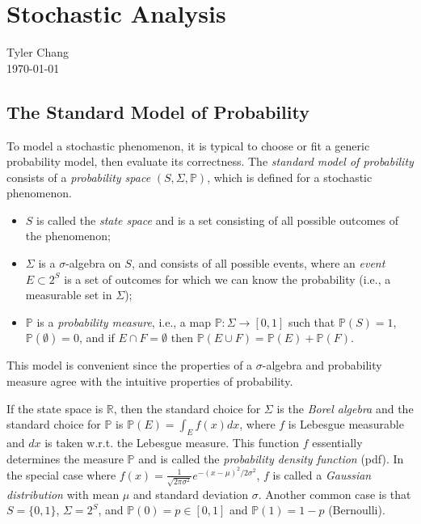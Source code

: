 \documentclass[12pt]{article}
\begin{document}
\section*{Stochastic Analysis}
Tyler Chang\\
\today

\subsection*{The Standard Model of Probability}

To model a stochastic phenomenon, it is typical to choose or fit a
generic probability model, then evaluate its correctness.
The {\it standard model of probability} consists of a
{\it probability space} $(S, \Sigma, \mathbb{P})$, which is defined
for a stochastic phenomenon.
\begin{itemize}
	\item $S$ is called the {\it state space} and is a set consisting
		of all possible outcomes of the phenomenon;
	\item $\Sigma$ is a $\sigma$-algebra on $S$, and consists of all
		possible events, where an {\it event} $E \subset 2^S$ is
		a set of outcomes for which we can know the probability
		(i.e., a measurable set in $\Sigma$);
	\item $\mathbb{P}$ is a {\it probability measure}, i.e., a map
		$\mathbb{P} : \Sigma \rightarrow [0, 1]$ such that
		$\mathbb{P}(S) = 1$, $\mathbb{P}(\emptyset) = 0$, and
		if $E \cap F = \emptyset$ then
		$\mathbb{P}(E \cup F) = \mathbb{P}(E) + \mathbb{P}(F)$.
\end{itemize}

This model is convenient since the properties of a $\sigma$-algebra
and probability measure agree with the intuitive properties of
probability.

If the state space is $\mathbb{R}$, then the standard choice for
$\Sigma$ is the {\it Borel algebra} and the standard choice for
$\mathbb{P}$ is $\mathbb{P}(E) = \int_E f(x) dx$, where
$f$ is Lebesgue measurable and $dx$ is taken w.r.t. the Lebesgue measure.
This function $f$ essentially determines the measure $\mathbb{P}$
and is called the {\it probability density function} (pdf).
In the special case where
$f(x) = \frac{1}{\sqrt{2\pi\sigma^2}} e^{-(x-\mu)^2/2\sigma^2}$,
$f$ is called a {\it Gaussian distribution} with mean $\mu$
and standard deviation $\sigma$.
Another common case is that $S = \{ 0, 1 \}$, $\Sigma = 2^S$,
and $\mathbb{P}(0) = p \in [0, 1]$ and $\mathbb{P}(1) = 1-p$
(Bernoulli).
\end{document}
